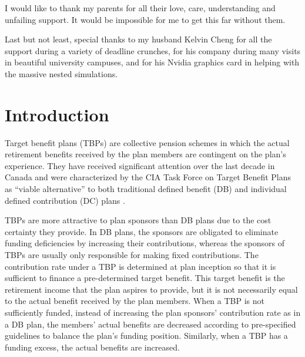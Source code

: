 \documentclass{sfuthesis}
\numberwithin{equation}{chapter}
\begin{document}
\begin{acknowledgements}
		

		\justify
		I would like to thank my parents for all their love, care, understanding and unfailing support. It would be impossible for me to get this far without them. 

		

		\justify
		Last but not least, special thanks to my husband Kelvin Cheng for all the support during a variety of deadline crunches, for his company during many visits in beautiful university campuses, and for his Nvidia graphics card in helping with the massive nested simulations. 

		
		
	\end{acknowledgements}
	
	\tableofcontents%
	\clearpage
	
	\listoftables%
	\clearpage
	
	\listoffigures%
	\clearpage
	
	
	
	
	
	
	\mainmatter%
	
	\chapter{Introduction} 
	\label{Introduction}
	

		\justify
		Target benefit plans (TBPs) are collective pension schemes in which the actual retirement benefits received by the plan members are contingent on the plan's experience. They have received significant attention over the last decade in Canada and were characterized by the CIA Task Force on Target Benefit Plans as ``viable alternative'' to both traditional defined benefit (DB) and individual defined contribution (DC) plans \citep{cia2015b}. 

	
		\justify
		TBPs are more attractive to plan sponsors than DB plans due to the cost certainty they provide. In DB plans, the sponsors are obligated to eliminate funding deficiencies by increasing their contributions, whereas the sponsors of TBPs are usually only responsible for making fixed contributions. The contribution rate under a TBP is determined at plan inception so that it is sufficient to finance a pre-determined target benefit. This target benefit is the retirement income that the plan aspires to provide, but it is not necessarily equal to the actual benefit received by the plan members. When a TBP is not sufficiently funded, instead of increasing the plan sponsors' contribution rate as in a DB plan, the members' actual benefits are decreased according to pre-specified guidelines to balance the plan's funding position. Similarly, when a TBP has a funding excess, the actual benefits are increased.
\end{document}
